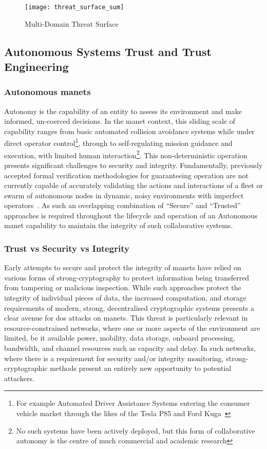 \begin{figure}[h!]
	\centering
	\texttt{[image: threat\_surface\_sum]}
	\caption[Multi-Domain Threat Surface]{Multi-Domain Threat Surface}
	\label{fig:threat_surface}
\end{figure}


\subsection{Autonomous Systems Trust and Trust Engineering}

\subsubsection{Autonomous \glspl{manet}}
Autonomy is the capability of an entity to assess its environment and make informed, un-coerced decisions.
In the \gls{manet} context, this sliding scale of capability ranges from basic automated collision avoidance systems while under direct operator control\footnote{For example Automated Driver Assistance Systems entering the consumer vehicle market through the likes of the Tesla P85 and Ford Kuga~\cite{Sawade2016}}, through to self-regulating mission guidance and execution, with limited human interaction\footnote{No such systems have been actively deployed, but this form of collaborative autonomy is the centre of much commercial and academic research\cite{Rajesh2015,Autefage2015,Teke2015}}.
This non-deterministic operation presents significant challenges to security and integrity.
Fundamentally, previously accepted formal verification methodologies for guaranteeing operation are not currently capable of accurately validating the actions and interactions of a fleet or swarm of autonomous nodes in dynamic, noisy environments with imperfect operators~\cite{Teke2015}. 
As such an overlapping combination of ``Secure'' and ``Trusted'' approaches is required throughout the lifecycle and operation of an Autonomous \gls{manet} capability to maintain the integrity of such collaborative systems.

\subsubsection{Trust vs Security vs Integrity}

Early attempts to secure and protect the integrity of \glspl{manet} have relied on various forms of strong-cryptography to protect information being transferred from tampering or malicious inspection.
While such approaches protect the integrity of individual pieces of data, the increased computation, and storage requirements of modern, strong, decentralised cryptographic systems presents a clear avenue for \gls{dos} attacks on \glspl{manet}.
This threat is particularly relevant in resource-constrained networks, where one or more aspects of the environment are limited, be it available power, mobility, data storage, onboard processing, bandwidth, and channel resources such as capacity and delay.
In such networks, where there is a requirement for security and/or integrity monitoring, strong-cryptographic methods present an entirely new opportunity to potential attackers.

